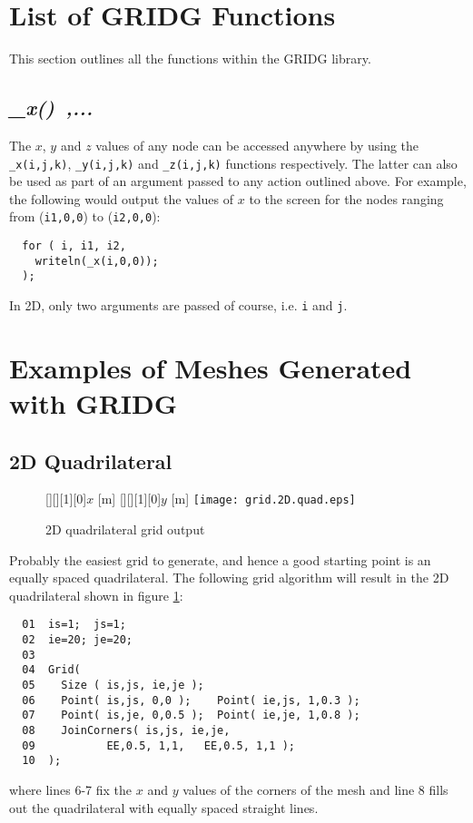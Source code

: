 \documentclass{warpdoc}
\newcommand{\fontxfig}{\footnotesize\scalefont{0.918}}
\begin{document}
\section{List of GRIDG Functions}

This section outlines all the functions within the GRIDG library. 

\subsection{\emph{\_x()~,...}}

The $x$, $y$ and $z$ values of any node can be accessed
anywhere by using the \verb|_x(i,j,k)|, \verb|_y(i,j,k)|
and \verb|_z(i,j,k)| functions respectively. The latter can
also be used  as part of an argument passed to any action outlined
above. For example, the following would output the values
of $x$ to the screen for the nodes ranging from (\verb|i1,0,0|)
to (\verb|i2,0,0|):
%
\begin{verbatim}
  for ( i, i1, i2,
    writeln(_x(i,0,0));
  );
\end{verbatim}
%
In 2D, only two arguments are passed of course, i.e. \verb|i|
and \verb|j|.



\section{Examples of Meshes Generated with GRIDG}


\subsection{2D Quadrilateral}


%
\begin{figure}[h]
\vspace{0.3cm}
   \fontxfig
   [][][1][0]{$x$ [m]}
   [][][1][0]{$y$ [m]}
   \texttt{[image: grid.2D.quad.eps]}
\caption{2D quadrilateral grid output}
\label{fig:gridquad}
\end{figure}
%

Probably the easiest grid to generate, and hence a good starting point
is an equally spaced quadrilateral.
The following grid algorithm will result in the 2D quadrilateral
shown in figure \ref{fig:gridquad}:
%
\begin{verbatim}
  01  is=1;  js=1;
  02  ie=20; je=20;
  03
  04  Grid(
  05    Size ( is,js, ie,je );
  06    Point( is,js, 0,0 );    Point( ie,js, 1,0.3 );
  07    Point( is,je, 0,0.5 );  Point( ie,je, 1,0.8 );
  08    JoinCorners( is,js, ie,je,
  09           EE,0.5, 1,1,   EE,0.5, 1,1 );
  10  );
\end{verbatim}
%
where lines 6-7 fix the $x$ and $y$ values of the corners of
the mesh and line 8 fills out the quadrilateral with
equally spaced straight lines.
\end{document}
